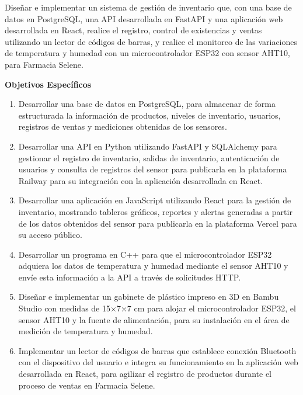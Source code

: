 
Diseñar e implementar un sistema de gestión de inventario que, con una base de datos en PostgreSQL, una API desarrollada en FastAPI y una aplicación web desarrollada en React, realice el registro, control de existencias y ventas utilizando un lector de códigos de barras, y realice el monitoreo de las variaciones de temperatura y humedad con un microcontrolador ESP32 con sensor AHT10, para Farmacia Selene.\\

{\bfseries\fontsize{14pt}{16pt}\selectfont Objetivos Específicos}

\begin{enumerate}[topsep=2pt, itemsep=4pt, parsep=0pt]
\item Desarrollar una base de datos en PostgreSQL, para almacenar de forma estructurada la información de productos, niveles de inventario, usuarios, registros de ventas y mediciones obtenidas de los sensores.

\item Desarrollar una API en Python utilizando FastAPI y SQLAlchemy para gestionar el registro de inventario, salidas de inventario, autenticación de usuarios y consulta de registros del sensor para publicarla en la plataforma Railway para su integración con la aplicación desarrollada en React.

\item Desarrollar una aplicación en JavaScript utilizando React para la gestión de inventario, mostrando tableros gráficos, reportes y alertas generadas a partir de los datos obtenidos del sensor para publicarla en la plataforma Vercel para su acceso público.

\item Desarrollar un programa en C++ para que el microcontrolador ESP32 adquiera los datos de temperatura y humedad mediante el sensor AHT10 y envíe esta información a la API a través de solicitudes HTTP.  

\item Diseñar e implementar un gabinete de plástico impreso en 3D en Bambu Studio con medidas de 15×7×7 cm para alojar el microcontrolador ESP32, el sensor AHT10 y la fuente de alimentación, para su instalación en el área de medición de temperatura y humedad.\newpage

\item Implementar un lector de códigos de barras que establece conexión Bluetooth con el dispositivo del usuario e integra su funcionamiento en la aplicación web desarrollada en React, para agilizar el registro de productos durante el proceso de ventas en Farmacia Selene.

\end{enumerate}

\thispagestyle{empty}
